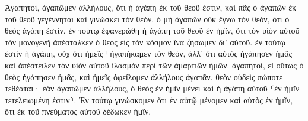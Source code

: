 \documentclass{openreader}
\begin{document}
Ἀγαπητοί, ἀγαπῶμεν ἀλλήλους, ὅτι ἡ ἀγάπη ἐκ τοῦ θεοῦ ἐστιν, καὶ πᾶς ὁ ἀγαπῶν ἐκ τοῦ θεοῦ γεγέννηται καὶ γινώσκει τὸν θεόν. ὁ μὴ ἀγαπῶν οὐκ ἔγνω τὸν θεόν, ὅτι ὁ θεὸς ἀγάπη ἐστίν. ἐν τούτῳ ἐφανερώθη ἡ ἀγάπη τοῦ θεοῦ ἐν ἡμῖν, ὅτι τὸν υἱὸν αὐτοῦ τὸν μονογενῆ ἀπέσταλκεν ὁ θεὸς εἰς τὸν κόσμον ἵνα ζήσωμεν δι’ αὐτοῦ. ἐν τούτῳ ἐστὶν ἡ ἀγάπη, οὐχ ὅτι ἡμεῖς ⸀ἠγαπήκαμεν τὸν θεόν, ἀλλ’ ὅτι αὐτὸς ἠγάπησεν ἡμᾶς καὶ ἀπέστειλεν τὸν υἱὸν αὐτοῦ ἱλασμὸν περὶ τῶν ἁμαρτιῶν ἡμῶν. ἀγαπητοί, εἰ οὕτως ὁ θεὸς ἠγάπησεν ἡμᾶς, καὶ ἡμεῖς ὀφείλομεν ἀλλήλους ἀγαπᾶν. θεὸν οὐδεὶς πώποτε τεθέαται· ἐὰν ἀγαπῶμεν ἀλλήλους, ὁ θεὸς ἐν ἡμῖν μένει καὶ ἡ ἀγάπη αὐτοῦ ⸂ἐν ἡμῖν τετελειωμένη ἐστιν⸃. Ἐν τούτῳ γινώσκομεν ὅτι ἐν αὐτῷ μένομεν καὶ αὐτὸς ἐν ἡμῖν, ὅτι ἐκ τοῦ πνεύματος αὐτοῦ δέδωκεν ἡμῖν. 
\end{document}
